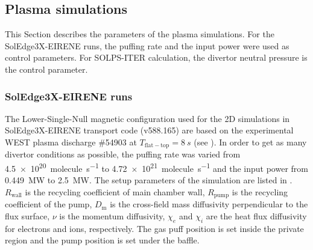 


\subsection{Plasma simulations}
This Section describes the parameters of the plasma simulations.
For the SolEdge3X-EIRENE runs, the puffing rate and the input power were used as control parameters.
For SOLPS-ITER calculation, the divertor neutral pressure is the control parameter.
\subsubsection{SolEdge3X-EIRENE runs}
The Lower-Single-Null magnetic configuration used for the 2D simulations in SolEdge3X-EIRENE transport code (v588.165) are based on the experimental WEST plasma discharge \#54903 at $T_\mathrm{flat-top} = \SI{8}{s}$ (see ).
In order to get as many divertor conditions as possible, the puffing rate was varied from \SI{4.5e20}{molecule.s^{-1}} to \SI{4.72e21}{molecule.s^{-1}} and the input power from \SI{0.449}{MW} to \SI{2.5}{MW}.
The setup parameters of the simulation are listed in .
$R_\mathrm{wall}$ is the recycling coefficient of main chamber wall, $R_\mathrm{pump}$ is the recycling coefficient of the pump, $D_\mathrm{m}$ is the cross-field mass diffusivity perpendicular to the flux surface, $\nu$ is the momentum diffusivity, $\chi_e$ and $\chi_i$ are the heat flux diffusivity for electrons and ions, respectively.
The gas puff position is set inside the private region and the pump position is set under the baffle.

